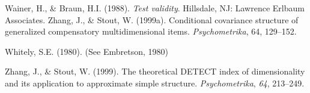 \documentclass[titlepage,11pt,twoside]{article}
\begin{document}
\begin{thebibliography}
\bibitem Wainer, H., \& Braun, H.I. (1988). \textit{Test validity}. Hillsdale, NJ: Lawrence Erlbaum Associates. Zhang, J., \& Stout, W. (1999a). Conditional covariance structure of generalized compensatory multidimensional items. \textit{Psychometrika}, 64, 129--152.

\bibitem Whitely, S.E. (1980). (See Embretson, 1980)

\bibitem Zhang, J., \& Stout, W. (1999). The theoretical DETECT index of dimensionality and its application to approximate simple structure. \textit{Psychometrika}, \textit{64}, 213--249.
\end{thebibliography}
\vspace{\fill}

\end{document}
